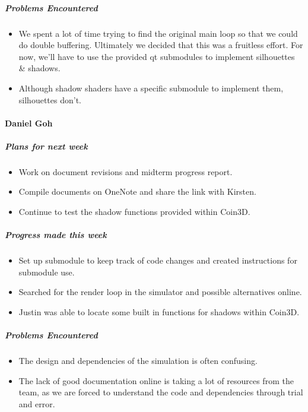{\subparagraph{Problems Encountered}
\begin{itemize}
  \item We spent a lot of time trying to find the original main loop so that we could do double buffering. Ultimately we decided that this was a fruitless effort. For now, we'll have to use the provided qt submodules to implement silhouettes \& shadows.
  \item Although shadow shaders have a specific submodule to implement them, silhouettes don't.
\end{itemize}

\vspace{3mm}
\paragraph{Daniel Goh}
\subparagraph{Plans for next week}
\begin{itemize}
  \item Work on document revisions and midterm progress report.
  \item Compile documents on OneNote and share the link with Kirsten.
  \item Continue to test the shadow functions provided within Coin3D.
\end{itemize}

\subparagraph{Progress made this week}
\begin{itemize}
  \item Set up submodule to keep track of code changes and created instructions for submodule use.
  \item Searched for the render loop in the simulator and possible alternatives online.
  \item Justin was able to locate some built in functions for shadows within Coin3D.
\end{itemize}

\subparagraph{Problems Encountered}
\begin{itemize}
  \item The design and dependencies of the simulation is often confusing.
  \item The lack of good documentation online is taking a lot of resources from the team, as we are forced to understand the code and dependencies through trial and error.
\end{itemize}

}

\newpage

